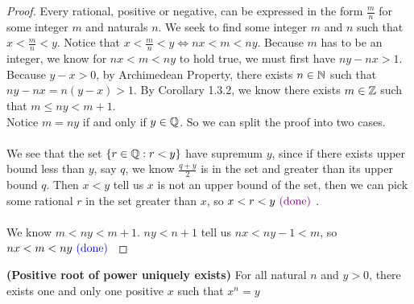 \documentclass{report}
\begin{document}
\begin{proof}
Every rational, positive or negative, can be expressed in the form $\frac{m}{n}$ for some integer $m$ and naturals $n$. We seek to find some integer $m$ and $n$ such that $x<\frac{m}{n}<y$. Notice that $x<\frac{m}{n}<y\iff nx<m<ny$. Because $m$ has to be an integer, we know for $nx<m<ny$ to hold true, we must first have $ny-nx>1$. Because $y-x>0$, by Archimedean Property, there exists $n\in\mathbb{N}$ such that $ny-nx=n(y-x)>1$. By Corollary 1.3.2, we know there exists $m \in\mathbb{Z}$ such that $m\leq  ny<m+1$.\\

Notice $m=ny$ if and only if $ y\in\mathbb{Q}$. So we can split the proof into two cases.\\

\\

We see that the set $\{ r\in\mathbb{Q}:r<y \}$ have supremum $y$, since if there exists upper bound less than $y$, say $q$, we know $\frac{q+y}{2}$ is in the set and greater than its upper bound $q$. Then $x<y$ tell us $x$ is not an upper bound of the set, then we can pick some rational $r$ in the set greater than $x$, so $x<r<y\textcolor{violet}{\text{ (done) }}$.\\

\\ 

We know $m<ny<m+1$. $ny<n+1$ tell us $nx<ny-1<m$, so $nx<m<ny\textcolor{blue}{\text{ (done) }}$ 
\end{proof}
\begin{theorem}
\textbf{(Positive root of power uniquely exists)} For all natural $n$ and $y>0$, there exists one and only one positive $x$ such that $x^n=y$
\end{theorem}
\end{document}
